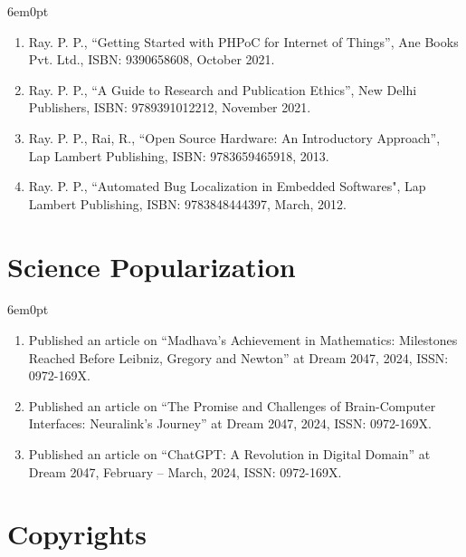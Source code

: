 \documentclass[11pt,a4paper]{moderncv}
\begin{document}
\begin{adjustwidth}{6em}{0pt}
\begin{enumerate}
		\item Ray. P. P., “Getting Started with PHPoC for Internet of Things”, Ane Books Pvt. Ltd., ISBN: 9390658608, October 2021.
		
		\item Ray. P. P., “A Guide to Research and Publication Ethics”, New Delhi Publishers, ISBN: 9789391012212, November 2021.
		
		\item Ray. P. P., Rai, R., “Open Source Hardware: An Introductory Approach”, Lap Lambert Publishing, ISBN: 9783659465918, 2013.
		
		\item Ray. P. P., “Automated Bug Localization in Embedded Softwares", Lap Lambert Publishing, ISBN: 9783848444397, March, 2012.
		
	\end{enumerate}
\end{adjustwidth}









\section{\textbf{Science Popularization}}

\begin{adjustwidth}{6em}{0pt}
	\begin{enumerate}
		
		\item Published an article on “Madhava’s Achievement in Mathematics: Milestones Reached Before Leibniz, Gregory and Newton” at Dream 2047, 2024, ISSN: 0972-169X.
		
		\item Published an article on “The Promise and Challenges of Brain-Computer Interfaces: Neuralink’s Journey” at Dream 2047, 2024, ISSN: 0972-169X.
		
		\item Published an article on “ChatGPT: A Revolution in Digital Domain” at Dream 2047, February – March, 2024, ISSN: 0972-169X.
		
	\end{enumerate}
\end{adjustwidth}





\section{\textbf{Copyrights}}
\end{document}
